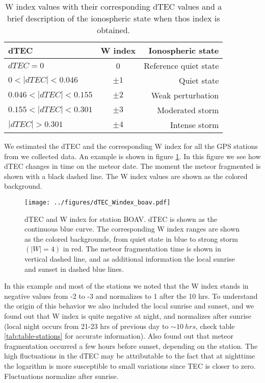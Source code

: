 \begin{table}
    \centering
    \caption{W index values with their corresponding dTEC values and a brief description of the ionospheric state when thos index is obtained.}
    \begin{tabular}{lcr}\toprule
    dTEC & W index   & Ionospheric state     \\
    \hline
    $dTEC = 0$ & 0   & Reference quiet state \\
    $0<|dTEC|<0.046$ & $\pm 1$ & Quiet state \\
    $0.046<|dTEC|<0.155$ & $\pm 2$ & Weak perturbation \\
    $0.155<|dTEC|<0.301$ & $\pm 3$ & Moderated storm   \\
    $|dTEC|> 0.301$  & $\pm 4$ & Intense storm         \\\bottomrule
    \end{tabular}
    \label{tab:W-index}
\end{table}

We estimated the dTEC and the corresponding W index for all the GPS stations from we collected data. An example is shown in figure \ref{fig:dtec-boav}. In this figure we see how dTEC changes in time on the meteor date. The moment the meteor fragmented is shown with a black dashed line. The W index values are shown as the colored background.

\begin{figure}
    \centering
    \texttt{[image: ../figures/dTEC\_Windex\_boav.pdf]}
    \caption{dTEC and W index for station BOAV. dTEC is shown as the continuous blue curve. The corresponding W index ranges are shown as the colored backgrounds, from quiet state in blue to strong storm $(|W|=4)$ in red. The meteor fragmentation time is shown in vertical dashed line, and  as additional information the local sunrise and sunset in dashed blue lines.}
    \label{fig:dtec-boav}
\end{figure}

In this example and most of the stations we noted that the W index stands in negative values from -2 to -3 and normalizes to 1 after the 10 hrs. To understand the origin of this behavior we also included the local sunrise and sunset, and we found out that W index is quite negative at night, and normalizes after sunrise (local night occurs from 21-23 hrs of previous day to $\sim \SI{10}{hrs}$, check table \ref{tab:table-stations} for accurate information). Also found out that meteor fragmentation occurred a few hours before sunset, depending on the station. The high fluctuations in the dTEC may be attributable to the fact that at nighttime the logarithm is more susceptible to small variations since TEC is closer to zero. Fluctuations normalize after sunrise.

